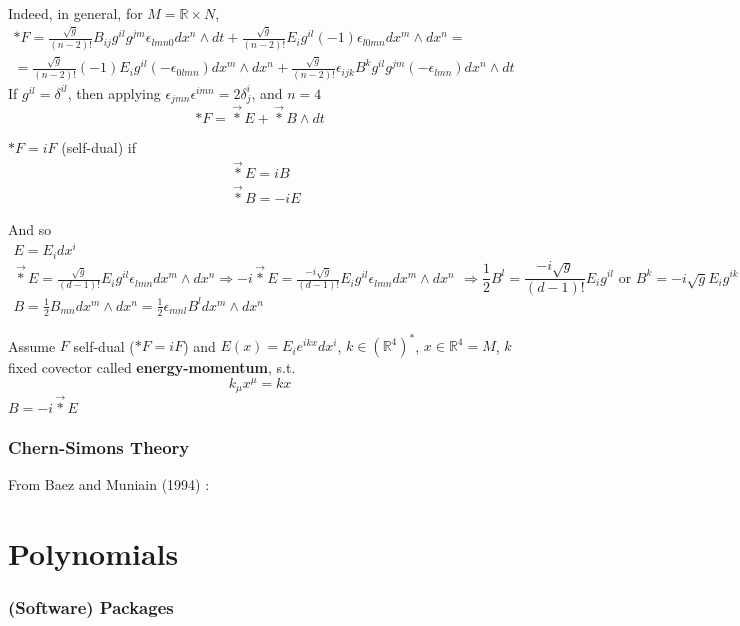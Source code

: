 \documentclass[10pt]{amsart}
\begin{document}
\begin{multicols*}{2}
Indeed, in general, for $M = \mathbb{R}\times N$, 
\[
\begin{gathered}
  *F = \frac{ \sqrt{g}}{ (n-2)!} B_{ij} g^{il}g^{jm} \epsilon_{lmn0} dx^n \wedge dt + \frac{\sqrt{g}}{(n-2)!} E_i g^{il} (-1) \epsilon_{l0mn} dx^m \wedge dx^n = \\
  =  \frac{\sqrt{g}}{ (n-2)!}(-1)E_i g^{il} (-\epsilon_{0lmn}) dx^m \wedge dx^n + \frac{\sqrt{g}}{(n-2)!} \epsilon_{ijk} B^k g^{il} g^{jm} (-\epsilon_{lmn})dx^n \wedge dt
\end{gathered}
\]
If $g^{il}= \delta^{il}$, then applying $\epsilon_{jmn}\epsilon^{imn} = 2\delta^i_j$, and $n=4$
\[
*F = \vec{*}E + \vec{*}B \wedge dt
\]

$*F = iF$ (self-dual) if 
\[
\begin{aligned}
  & \vec{*} E= iB \\ 
  & \vec{*} B= -i E
\end{aligned}
\]

And so 
\[
\begin{gathered}
  E = E_i dx^i \\ 
  \vec{*} E = \frac{ \sqrt{g}}{ (d-1)!} E_i g^{il} \epsilon_{lmn} dx^m \wedge dx^n \Longrightarrow -i \vec{*} E = \frac{-i\sqrt{g}}{ (d-1)!} E_i g^{il} \epsilon_{lmn} dx^m \wedge dx^n \\ 
  B = \frac{1}{2} B_{mn} dx^m \wedge dx^n = \frac{1}{2} \epsilon_{mnl} B^l dx^m \wedge dx^n 
\end{gathered} \Longrightarrow \frac{1}{2} B^l = \frac{-i \sqrt{g}}{ (d-1)!} E_i g^{il} \text{ or } B^k = -i \sqrt{g} E_i g^{ik}
\]


Assume $F$ self-dual ($*F = iF$) and $E(x) = E_i e^{ikx} dx^i$, $k \in (\mathbb{R}^4)^*$, $x\in \mathbb{R}^4 = M$, $k$ fixed covector called \textbf{energy-momentum}, s.t. 
\[
k_{\mu} x^{\mu} = kx
\]
$B= -i \vec{*} E$




\section{Chern-Simons Theory}

From Baez and Muniain (1994) \cite{JBaezJMuniain1994}: 




\part{Polynomials}

\section{(Software) Packages}


\end{multicols*}
\end{document}
